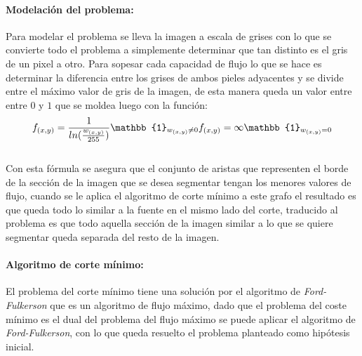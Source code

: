 \documentclass[a4paper,10pt,twocolumn]{article}
\begin{document}
\paragraph*{Modelaci\'on del problema:}
Para modelar el problema se lleva la imagen a escala de grises con lo que se convierte todo el problema a simplemente 
determinar que tan distinto es el gris de un pixel a otro. Para sopesar cada capacidad de flujo lo que se hace es determinar la
diferencia entre los grises de ambos pieles adyacentes y se divide entre el m\'aximo valor de gris de la imagen, de esta manera
queda un valor entre entre $0$ y $1$ que se moldea luego con la funci\'on:\\
\begin{equation}
	f_{(x,y)} = \frac{1}{ln(\frac{w_{(x,y)}}{255})} \mathbb{1}_{w_{(x,y)} \neq 0}\\
	f_{(x,y)} = \infty \mathbb{1}_{w_{(x,y)} = 0}
\end{equation}
\\
Con esta f\'ormula se asegura que el conjunto de aristas que representen el borde de la secci\'on de la imagen que se desea segmentar 
tengan los menores valores de flujo, cuando se le aplica el algoritmo de corte m\'inimo a este grafo el resultado es que queda todo lo similar a la 
fuente en el mismo lado del corte, traducido al problema es que todo aquella secci\'on de la imagen similar a lo que se quiere segmentar queda
separada del resto de la imagen.\\

\paragraph*{Algoritmo de corte m\'inimo:}
El problema del corte m\'inimo tiene una soluci\'on por el algoritmo de \textit{Ford-Fulkerson} que es un algoritmo de flujo m\'aximo,
dado que el problema del coste m\'inimo es el dual del problema del flujo m\'aximo se puede aplicar el algoritmo de \textit{Ford-Fulkerson},
con lo que queda resuelto el problema planteado como hip\'otesis inicial.\\







\end{document}
